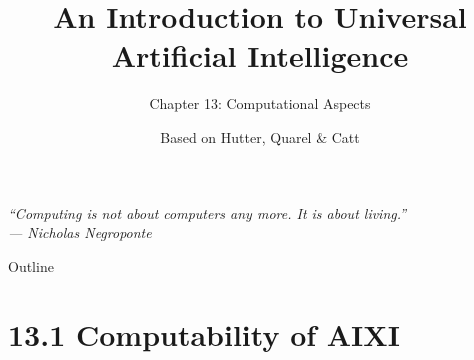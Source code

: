 \documentclass[aspectratio=169,10pt]{beamer}
\title[UAI -- Ch.13 Computational Aspects]{An Introduction to Universal Artificial Intelligence}
\subtitle{Chapter 13: Computational Aspects}
\author{Based on Hutter, Quarel \& Catt}
\institute{CRC Press, 2024}
\date{}
\begin{document}

\begin{frame}
  \titlepage
  \begin{center}
  \small\itshape ``Computing is not about computers any more. It is about living.''\\ --- Nicholas Negroponte
  \end{center}
\end{frame}

\begin{frame}{Outline}
  \tableofcontents
\end{frame}

\section{13.1 Computability of AIXI}
\end{document}
